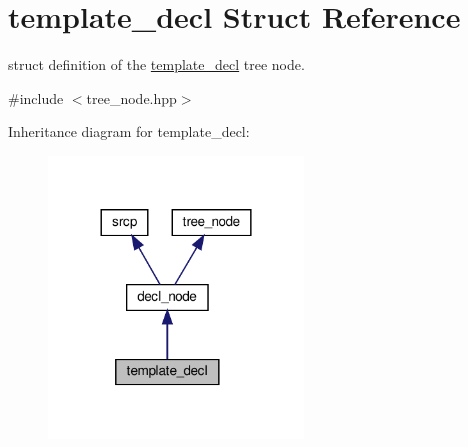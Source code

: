 \hypertarget{structtemplate__decl}{}\section{template\+\_\+decl Struct Reference}
\label{structtemplate__decl}


struct definition of the \hyperlink{structtemplate__decl}{template\+\_\+decl} tree node.  




{\ttfamily \#include $<$tree\+\_\+node.\+hpp$>$}



Inheritance diagram for template\+\_\+decl\+:
\nopagebreak
\begin{figure}[H]
\begin{center}
\leavevmode
\includegraphics[width=192pt]{df/d66/structtemplate__decl__inherit__graph}
\end{center}
\end{figure}


